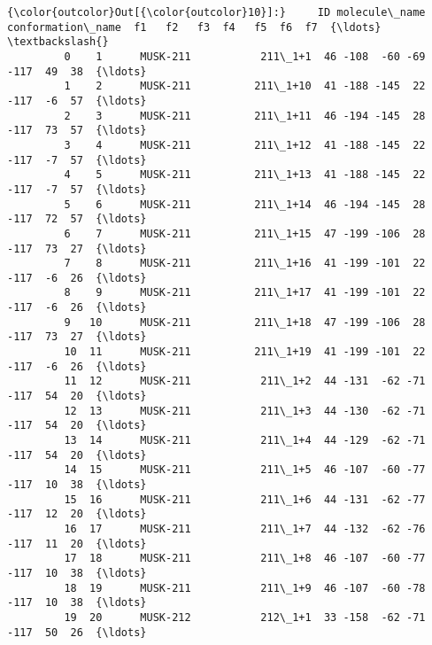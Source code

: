 \documentclass[11pt]{article}
\begin{document}
\begin{Verbatim}[commandchars=\\\{\}]
{\color{outcolor}Out[{\color{outcolor}10}]:}     ID molecule\_name conformation\_name  f1   f2   f3  f4   f5  f6  f7  {\ldots}  \textbackslash{}
         0    1      MUSK-211           211\_1+1  46 -108  -60 -69 -117  49  38  {\ldots}   
         1    2      MUSK-211          211\_1+10  41 -188 -145  22 -117  -6  57  {\ldots}   
         2    3      MUSK-211          211\_1+11  46 -194 -145  28 -117  73  57  {\ldots}   
         3    4      MUSK-211          211\_1+12  41 -188 -145  22 -117  -7  57  {\ldots}   
         4    5      MUSK-211          211\_1+13  41 -188 -145  22 -117  -7  57  {\ldots}   
         5    6      MUSK-211          211\_1+14  46 -194 -145  28 -117  72  57  {\ldots}   
         6    7      MUSK-211          211\_1+15  47 -199 -106  28 -117  73  27  {\ldots}   
         7    8      MUSK-211          211\_1+16  41 -199 -101  22 -117  -6  26  {\ldots}   
         8    9      MUSK-211          211\_1+17  41 -199 -101  22 -117  -6  26  {\ldots}   
         9   10      MUSK-211          211\_1+18  47 -199 -106  28 -117  73  27  {\ldots}   
         10  11      MUSK-211          211\_1+19  41 -199 -101  22 -117  -6  26  {\ldots}   
         11  12      MUSK-211           211\_1+2  44 -131  -62 -71 -117  54  20  {\ldots}   
         12  13      MUSK-211           211\_1+3  44 -130  -62 -71 -117  54  20  {\ldots}   
         13  14      MUSK-211           211\_1+4  44 -129  -62 -71 -117  54  20  {\ldots}   
         14  15      MUSK-211           211\_1+5  46 -107  -60 -77 -117  10  38  {\ldots}   
         15  16      MUSK-211           211\_1+6  44 -131  -62 -77 -117  12  20  {\ldots}   
         16  17      MUSK-211           211\_1+7  44 -132  -62 -76 -117  11  20  {\ldots}   
         17  18      MUSK-211           211\_1+8  46 -107  -60 -77 -117  10  38  {\ldots}   
         18  19      MUSK-211           211\_1+9  46 -107  -60 -78 -117  10  38  {\ldots}   
         19  20      MUSK-212           212\_1+1  33 -158  -62 -71 -117  50  26  {\ldots}   
         

\end{Verbatim}
\end{document}
